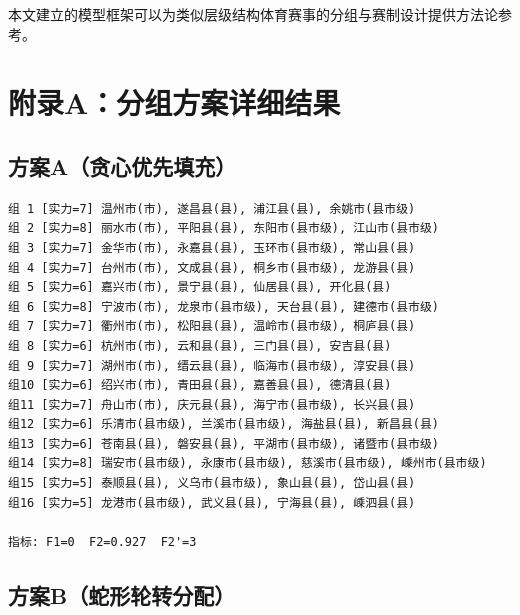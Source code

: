 \documentclass[12pt,a4paper]{article}
\begin{document}
本文建立的模型框架可以为类似层级结构体育赛事的分组与赛制设计提供方法论参考。

\newpage

\section*{附录A：分组方案详细结果}

\subsection*{方案A（贪心优先填充）}

{\small
\begin{verbatim}
组 1 [实力=7] 温州市(市), 遂昌县(县), 浦江县(县), 余姚市(县市级)
组 2 [实力=8] 丽水市(市), 平阳县(县), 东阳市(县市级), 江山市(县市级)
组 3 [实力=7] 金华市(市), 永嘉县(县), 玉环市(县市级), 常山县(县)
组 4 [实力=7] 台州市(市), 文成县(县), 桐乡市(县市级), 龙游县(县)
组 5 [实力=6] 嘉兴市(市), 景宁县(县), 仙居县(县), 开化县(县)
组 6 [实力=8] 宁波市(市), 龙泉市(县市级), 天台县(县), 建德市(县市级)
组 7 [实力=7] 衢州市(市), 松阳县(县), 温岭市(县市级), 桐庐县(县)
组 8 [实力=6] 杭州市(市), 云和县(县), 三门县(县), 安吉县(县)
组 9 [实力=7] 湖州市(市), 缙云县(县), 临海市(县市级), 淳安县(县)
组10 [实力=6] 绍兴市(市), 青田县(县), 嘉善县(县), 德清县(县)
组11 [实力=7] 舟山市(市), 庆元县(县), 海宁市(县市级), 长兴县(县)
组12 [实力=6] 乐清市(县市级), 兰溪市(县市级), 海盐县(县), 新昌县(县)
组13 [实力=6] 苍南县(县), 磐安县(县), 平湖市(县市级), 诸暨市(县市级)
组14 [实力=8] 瑞安市(县市级), 永康市(县市级), 慈溪市(县市级), 嵊州市(县市级)
组15 [实力=5] 泰顺县(县), 义乌市(县市级), 象山县(县), 岱山县(县)
组16 [实力=5] 龙港市(县市级), 武义县(县), 宁海县(县), 嵊泗县(县)

指标: F1=0  F2=0.927  F2'=3
\end{verbatim}
}

\subsection*{方案B（蛇形轮转分配）}
\end{document}
